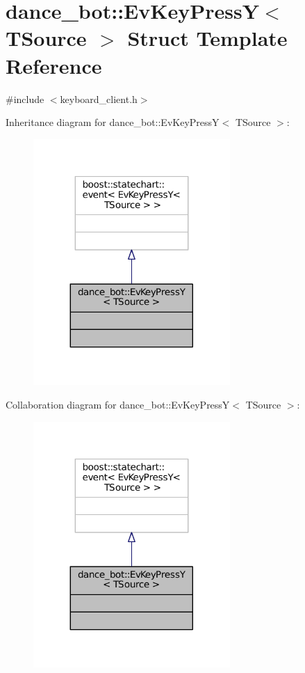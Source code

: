 \hypertarget{structdance__bot_1_1EvKeyPressY}{}\section{dance\+\_\+bot\+:\+:Ev\+Key\+PressY$<$ T\+Source $>$ Struct Template Reference}
\label{structdance__bot_1_1EvKeyPressY}


{\ttfamily \#include $<$keyboard\+\_\+client.\+h$>$}



Inheritance diagram for dance\+\_\+bot\+:\+:Ev\+Key\+PressY$<$ T\+Source $>$\+:
\nopagebreak
\begin{figure}[H]
\begin{center}
\leavevmode
\includegraphics[width=212pt]{structdance__bot_1_1EvKeyPressY__inherit__graph}
\end{center}
\end{figure}


Collaboration diagram for dance\+\_\+bot\+:\+:Ev\+Key\+PressY$<$ T\+Source $>$\+:
\nopagebreak
\begin{figure}[H]
\begin{center}
\leavevmode
\includegraphics[width=212pt]{structdance__bot_1_1EvKeyPressY__coll__graph}
\end{center}
\end{figure}


